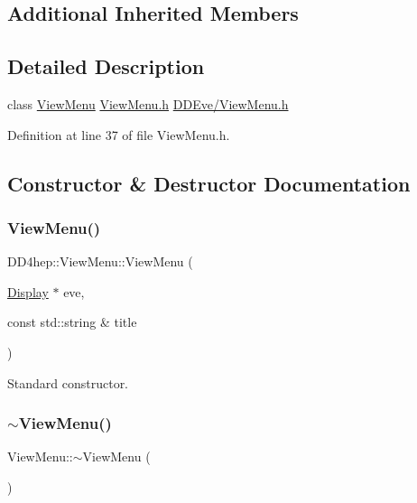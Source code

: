 \subsection*{Additional Inherited Members}


\subsection{Detailed Description}
class \hyperlink{class_d_d4hep_1_1_view_menu}{View\+Menu} \hyperlink{_view_menu_8h}{View\+Menu.\+h} \hyperlink{_view_menu_8h}{D\+D\+Eve/\+View\+Menu.\+h} 

Definition at line 37 of file View\+Menu.\+h.



\subsection{Constructor \& Destructor Documentation}
\hypertarget{class_d_d4hep_1_1_view_menu_a94db1dcf6c0d83d0c31f03f3817f530f}{}\label{class_d_d4hep_1_1_view_menu_a94db1dcf6c0d83d0c31f03f3817f530f} 
\subsubsection{\texorpdfstring{View\+Menu()}{ViewMenu()}}
{\footnotesize\ttfamily D\+D4hep\+::\+View\+Menu\+::\+View\+Menu (\begin{DoxyParamCaption}\item[{\hyperlink{class_d_d4hep_1_1_display}{Display} $\ast$}]{eve,  }\item[{const std\+::string \&}]{title }\end{DoxyParamCaption})}



Standard constructor. 

\hypertarget{class_d_d4hep_1_1_view_menu_ad36eb8eac44790e3b64f1cce2c048c28}{}\label{class_d_d4hep_1_1_view_menu_ad36eb8eac44790e3b64f1cce2c048c28} 
\subsubsection{\texorpdfstring{$\sim$\+View\+Menu()}{~ViewMenu()}}
{\footnotesize\ttfamily View\+Menu\+::$\sim$\+View\+Menu (\begin{DoxyParamCaption}{ }\end{DoxyParamCaption})\hspace{0.3cm}{\ttfamily [virtual]}}



